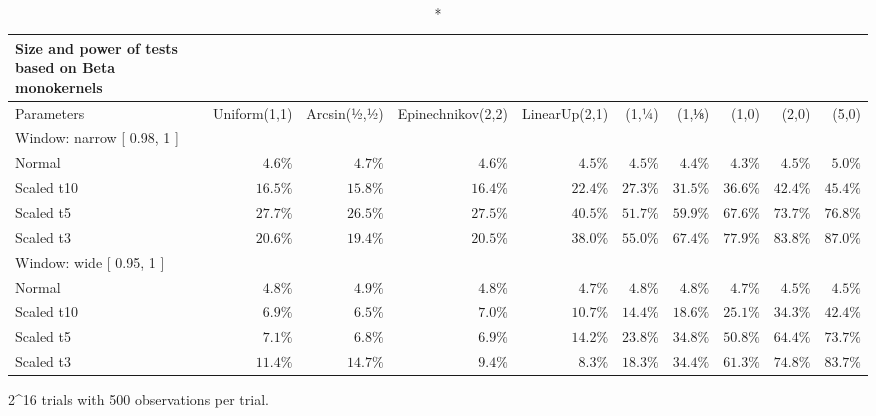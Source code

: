 \setlength{\LTpost}{0mm}
\begin{longtable}{lrrrrrrrrr}
\caption*{
{\large Size and power of tests based on Beta monokernels}
} \\ 
\toprule
Parameters & Uniform(1,1) & Arcsin(½,½) & Epinechnikov(2,2) & LinearUp(2,1) & (1,¼) & (1,⅛) & (1,0) & (2,0) & (5,0) \\ 
\midrule
\multicolumn{10}{l}{Window:  narrow  [ 0.98, 1 ]} \\ 
\midrule
Normal & $4.6\%$ & $4.7\%$ & $4.6\%$ & $4.5\%$ & $4.5\%$ & $4.4\%$ & $4.3\%$ & $4.5\%$ & $5.0\%$ \\ 
Scaled t10 & $16.5\%$ & $15.8\%$ & $16.4\%$ & $22.4\%$ & $27.3\%$ & $31.5\%$ & $36.6\%$ & $42.4\%$ & $45.4\%$ \\ 
Scaled t5 & $27.7\%$ & $26.5\%$ & $27.5\%$ & $40.5\%$ & $51.7\%$ & $59.9\%$ & $67.6\%$ & $73.7\%$ & $76.8\%$ \\ 
Scaled t3 & $20.6\%$ & $19.4\%$ & $20.5\%$ & $38.0\%$ & $55.0\%$ & $67.4\%$ & $77.9\%$ & $83.8\%$ & $87.0\%$ \\ 
\midrule
\multicolumn{10}{l}{Window:  wide  [ 0.95, 1 ]} \\ 
\midrule
Normal & $4.8\%$ & $4.9\%$ & $4.8\%$ & $4.7\%$ & $4.8\%$ & $4.8\%$ & $4.7\%$ & $4.5\%$ & $4.5\%$ \\ 
Scaled t10 & $6.9\%$ & $6.5\%$ & $7.0\%$ & $10.7\%$ & $14.4\%$ & $18.6\%$ & $25.1\%$ & $34.3\%$ & $42.4\%$ \\ 
Scaled t5 & $7.1\%$ & $6.8\%$ & $6.9\%$ & $14.2\%$ & $23.8\%$ & $34.8\%$ & $50.8\%$ & $64.4\%$ & $73.7\%$ \\ 
Scaled t3 & $11.4\%$ & $14.7\%$ & $9.4\%$ & $8.3\%$ & $18.3\%$ & $34.4\%$ & $61.3\%$ & $74.8\%$ & $83.7\%$ \\ 
\bottomrule
\end{longtable}
\begin{minipage}{\linewidth}
2\textasciicircum{}16 trials with 500 observations per trial.\\
\end{minipage}

